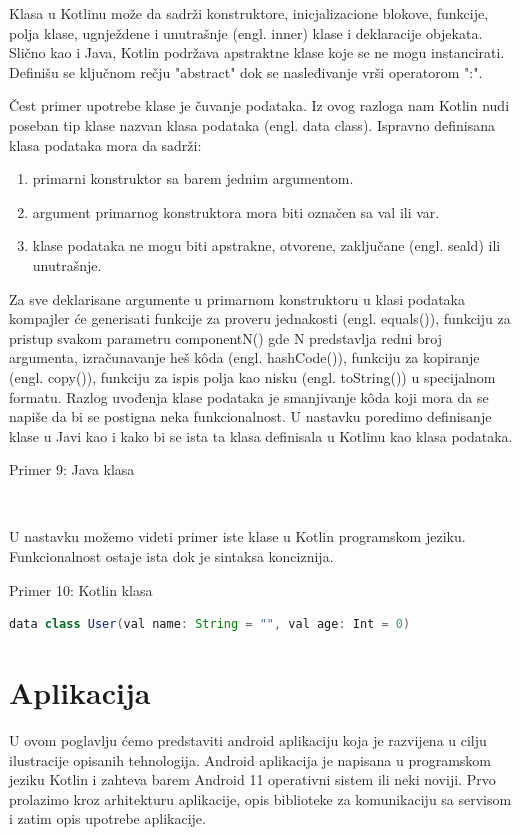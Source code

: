 \documentclass[12pt,oneside]{memoir}
\begin{document}
Klasa u Kotlinu može da sadrži konstruktore, inicjalizacione blokove, funkcije, polja klase, ugnježdene i unutrašnje (engl. inner) klase i deklaracije objekata. Slično kao i Java, Kotlin podržava apstraktne klase koje se ne mogu instancirati. Definišu se ključnom rečju "abstract" dok se nasleđivanje vrši operatorom ":".
 
Čest primer upotrebe klase je čuvanje podataka. Iz ovog razloga nam Kotlin nudi poseban tip klase nazvan klasa podataka (engl. data class). Ispravno definisana klasa podataka mora da sadrži:
\begin{enumerate}
  \item primarni konstruktor sa barem jednim argumentom.
  \item argument primarnog konstruktora mora biti označen sa val ili var.
  \item klase podataka ne mogu biti apstrakne, otvorene, zaključane (engl. seald) ili unutrašnje.
\end{enumerate}


Za sve deklarisane argumente u primarnom konstruktoru u klasi podataka kompajler će generisati funkcije za proveru jednakosti (engl. equals()), funkciju za pristup svakom parametru componentN() gde N predstavlja redni broj argumenta, izračunavanje heš kôda (engl. hashCode()), funkciju za kopiranje (engl. copy()), funkciju za ispis polja kao nisku (engl. toString()) u specijalnom formatu. Razlog uvođenja klase podataka je smanjivanje kôda koji mora da se napiše da bi se postigna neka funkcionalnost. U nastavku poredimo definisanje klase u Javi kao i kako bi se ista ta klasa definisala u Kotlinu kao klasa podataka.

\begin{center} Primer 9: Java klasa\end{center}
\begin{lstlisting}
 
\end{lstlisting}
U nastavku možemo videti primer iste klase u Kotlin programskom jeziku. Funkcionalnost ostaje ista dok je sintaksa konciznija.
\begin{center} Primer 10: Kotlin klasa\end{center}
\begin{lstlisting}[language=Java]
data class User(val name: String = "", val age: Int = 0)
\end{lstlisting}

\section{Aplikacija}
U ovom poglavlju ćemo predstaviti android aplikaciju koja je razvijena u cilju ilustracije opisanih tehnologija. Android aplikacija je napisana u programskom jeziku Kotlin i zahteva barem Android 11 operativni sistem ili neki noviji. Prvo prolazimo kroz arhitekturu aplikacije, opis biblioteke za komunikaciju sa servisom i zatim opis upotrebe aplikacije.
 
\end{document}
